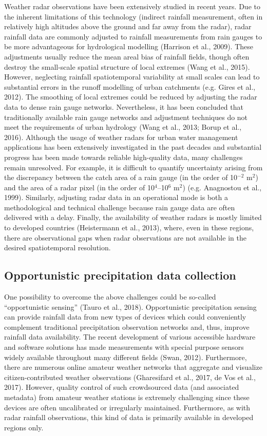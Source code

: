 \documentclass{ctuthesis}\usepackage[]{graphicx}\usepackage[]{color}
\begin{document}
Weather radar observations have been extensively studied in recent years. Due to the inherent limitations of this technology (indirect rainfall measurement, often in relatively high altitudes above the ground and far away from the radar), radar rainfall data are commonly adjusted to rainfall measurements from rain gauges to be more advantageous for hydrological modelling (Harrison et al., 2009). These adjustments usually reduce the mean areal bias of rainfall fields, though often destroy the small-scale spatial structure of local extremes (Wang et al., 2015). However, neglecting rainfall spatiotemporal variability at small scales can lead to substantial errors in the runoff modelling of urban catchments (e.g. Gires et al., 2012). The smoothing of local extremes could be reduced by adjusting the radar data to dense rain gauge networks. Nevertheless, it has been concluded that traditionally available rain gauge networks and adjustment techniques do not meet the requirements of urban hydrology (Wang et al., 2013; Borup et al., 2016). Although the usage of weather radars for urban water management applications has been extensively investigated in the past decades and substantial progress has been made towards reliable high-quality data, many challenges remain unresolved. For example, it is difficult to quantify uncertainty arising from the discrepancy between the catch area of a rain gauge (in the order of 10$^{-2}$ m$^2$) and the area of a radar pixel (in the order of 10$^4$--10$^6$ m$^2$) (e.g. Anagnostou et al., 1999). Similarly, adjusting radar data in an operational mode is both a methodological and technical challenge because rain gauge data are often delivered with a delay. Finally, the availability of weather radars is mostly limited to developed countries (Heistermann et al., 2013), where, even in these regions, there are observational gaps when radar observations are not available in the desired spatiotemporal resolution.

\subsection{Opportunistic precipitation data collection}

One possibility to overcome the above challenges could be so-called \enquote{opportunistic sensing} (Tauro et al., 2018). Opportunistic precipitation sensing can provide rainfall data from new types of devices which could conveniently complement traditional precipitation observation networks and, thus, improve rainfall data availability. The recent development of various accessible hardware and software solutions has made measurements with special purpose sensors widely available throughout many different fields (Swan, 2012). Furthermore, there are numerous online amateur weather networks that aggregate and visualize citizen-contributed weather observations (Gharesifard et al., 2017, de Vos et al., 2017). However, quality control of such crowdsourced data (and associated metadata) from amateur weather stations is extremely challenging since these devices are often uncalibrated or irregularly maintained. Furthermore, as with radar rainfall observations, this kind of data is primarily available in developed regions only.
\end{document}
